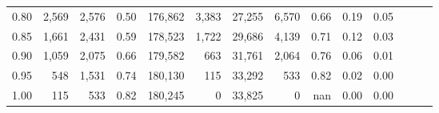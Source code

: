 \begin{tabular}{rrrrrrrrrrrrrr}
0.80 &   2,569 &  2,576 &  0.50 &  176,862 &    3,383 &  27,255 &   6,570 &  0.66 &  0.19 &      0.05 \\
0.85 &   1,661 &  2,431 &  0.59 &  178,523 &    1,722 &  29,686 &   4,139 &  0.71 &  0.12 &      0.03 \\
0.90 &   1,059 &  2,075 &  0.66 &  179,582 &      663 &  31,761 &   2,064 &  0.76 &  0.06 &      0.01 \\
0.95 &     548 &  1,531 &  0.74 &  180,130 &      115 &  33,292 &     533 &  0.82 &  0.02 &      0.00 \\
1.00 &     115 &    533 &  0.82 &  180,245 &        0 &  33,825 &       0 &   nan &  0.00 &      0.00 \\
\bottomrule
\end{tabular}
